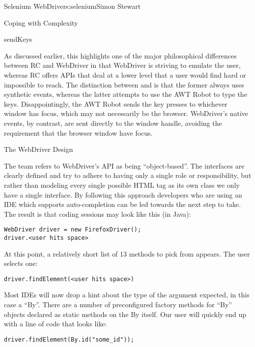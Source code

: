 \begin{aosachapter}{Selenium WebDriver}{s:selenium}{Simon Stewart}
\begin{aosasect1}{Coping with Complexity}
\begin{aosaitemize}
\item sendKeys

\end{aosaitemize}

As discussed earlier, this highlights one of the major philosophical
differences between RC and WebDriver in that WebDriver is striving to
emulate the user, whereas RC offers APIs that deal at a lower level
that a user would find hard or impossible to reach. The distinction
between  and  is that the former
always uses synthetic events, whereas the latter attempts to use the
AWT Robot to type the keys. Disappointingly, the AWT Robot sends the
key presses to whichever window has focus, which may not necessarily
be the browser. WebDriver's native events, by contrast, are sent
directly to the window handle, avoiding the requirement that the
browser window have focus.

\begin{aosasect2}{The WebDriver Design}

The team refers to WebDriver's API as being ``object-based''. The
interfaces are clearly defined and try to adhere to having only a
single role or responsibility, but rather than modeling every single
possible HTML tag as its own class we only have a single
 interface. By following this approach developers
who are using an IDE which supports auto-completion can be led towards
the next step to take. The result is that coding sessions may
look like this (in Java):

\begin{verbatim}
WebDriver driver = new FirefoxDriver();
driver.<user hits space>
\end{verbatim}

\noindent At this point, a relatively short list of 13 methods to pick from
appears. The user selects one:

\begin{verbatim}
driver.findElement(<user hits space>)
\end{verbatim}

\noindent Most IDEs will now drop a hint about the type of the argument
expected, in this case a ``By''. There are a number of preconfigured
factory methods for ``By'' objects declared as static methods on the
By itself. Our user will quickly end up with a line of code that looks
like:

\begin{verbatim}
driver.findElement(By.id("some_id"));
\end{verbatim}


\end{aosasect2}
\end{aosasect1}
\end{aosachapter}
